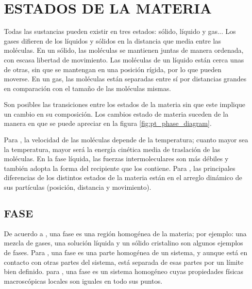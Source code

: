 \section{ESTADOS DE LA MATERIA}
Todas las sustancias pueden existir en tres estados: sólido, líquido y gas... Los gases difieren de los líquidos y sólidos en la distancia que media entre las moléculas. En un sólido, las moléculas se mantienen juntas de manera ordenada, con escasa libertad de movimiento. Las moléculas de un líquido están cerca unas de otras, sin que se mantengan en una posición rígida, por lo que pueden moverse. En un gas, las moléculas están separadas entre sí por distancias grandes en comparación con el tamaño de las moléculas mismas. \parencite[p. 9]{bib:ChangQmc2010}


Son posibles las transiciones entre los estados de la materia sin que este implique un cambio en su composición. Los cambios estado de materia suceden de la manera en que se puede apreciar en la figura \ref{fig:pt_phase_diagram}.

Para \textcite{bib:cengel2015termodinamica}, la velocidad de las moléculas depende de la temperatura; cuanto mayor sea la temperatura, mayor será la energía cinética media de traslación de las moléculas. En la fase líquida, las fuerzas intermoleculares son más débiles y también adopta la forma del recipiente  que los contiene. Para \parencite{bib:ReyesChumacero2012}, las principales diferencias de los distintos estados de la materia están en el arreglo dinámico de sus partículas (posición, distancia y movimiento).





\subsection{FASE}
  De acuerdo a \parencite[p. 30]{bib:thermo:VanNess}, una fase es una región homogénea de la materia; por ejemplo: una mezcla de gases, una solución líquida y un sólido cristalino son algunos ejemplos de fases. Para \parencite[p. 461]{bib:ChangQmc2010}, una fase es una parte homogénea de un sistema, y aunque está en contacto con otras partes del sistema, está separada de esas partes por un límite bien definido. para \parencite[p. 28]{bib:rodriguez2010termodinamica}, una fase es un sistema homogéneo cuyas propiedades físicas macroscópicas locales son iguales en todo sus puntos.
    
